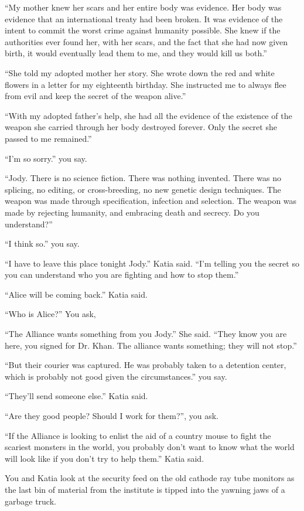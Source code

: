 \documentclass[17pt, twoside, a5paper, openright, extrafontsizes]{memoir}
\begin{document}
``My mother knew her scars and her entire body was evidence. Her body
was evidence that an international treaty had been broken. It was
evidence of the intent to commit the worst crime against humanity
possible. She knew if the authorities ever found her, with her scars,
and the fact that she had now given birth, it would eventually lead them
to me, and they would kill us both.''

``She told my adopted mother her story. She wrote down the red and white
flowers in a letter for my eighteenth birthday. She instructed me to
always flee from evil and keep the secret of the weapon alive.''

``With my adopted father's help, she had all the evidence of the
existence of the weapon she carried through her body destroyed forever.
Only the secret she passed to me remained.''

``I'm so sorry.'' you say.

``Jody. There is no science fiction. There was nothing invented. There
was no splicing, no editing, or cross-breeding, no new genetic design
techniques. The weapon was made through specification, infection and
selection. The weapon was made by rejecting humanity, and embracing
death and secrecy. Do you understand?''

``I think so.'' you say.

``I have to leave this place tonight Jody.'' Katia said. ``I'm telling
you the secret so you can understand who you are fighting and how to
stop them.''

``Alice will be coming back.'' Katia said.

``Who is Alice?'' You ask,

``The Alliance wants something from you Jody.'' She said. ``They know
you are here, you signed for Dr. Khan. The alliance wants something;
they will not stop.''

``But their courier was captured. He was probably taken to a detention
center, which is probably not good given the circumstances.'' you say.

``They'll send someone else.'' Katia said.

``Are they good people? Should I work for them?'', you ask.

``If the Alliance is looking to enlist the aid of a country mouse to
fight the scariest monsters in the world, you probably don't want to
know what the world will look like if you don't try to help them.''
Katia said.

You and Katia look at the security feed on the old cathode ray tube
monitors as the last bin of material from the institute is tipped into
the yawning jaws of a garbage truck.
\end{document}
